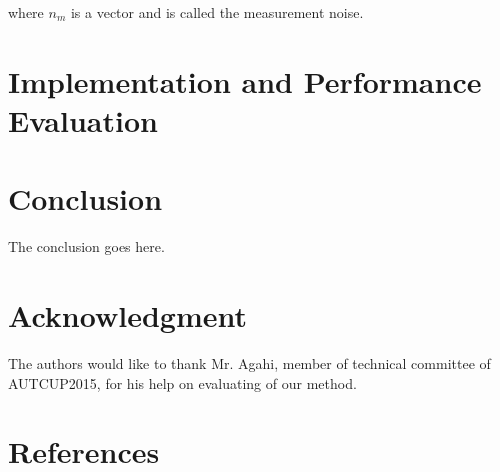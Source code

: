 \documentclass[conference]{IEEEtran}
\begin{document}
where $n_m$ is a vector and is called the measurement noise. 


\section{Implementation and Performance Evaluation}


\section{Conclusion}
The conclusion goes here.






\section*{Acknowledgment}


The authors would like to thank Mr. Agahi, member of technical committee of AUTCUP2015, for his help on evaluating of our method.




\section{References}

\end{document}
